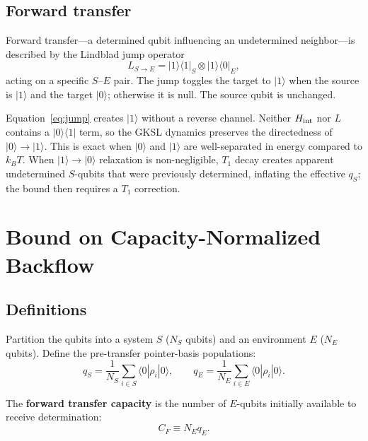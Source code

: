 \documentclass[aps,prl,twocolumn,superscriptaddress,hyperref]{revtex4-2}
\begin{document}
\subsection{Forward transfer}

Forward transfer---a determined qubit influencing an undetermined neighbor---is described by the Lindblad jump operator~\cite{Lindblad:1976,GKS:1976}
\begin{equation}
L_{S\to E} = |1\rangle\langle 1|_S \otimes |1\rangle\langle 0|_E,
\label{eq:jump}
\end{equation}
acting on a specific $S$--$E$ pair. The jump toggles the target to $|1\rangle$ when the source is $|1\rangle$ and the target $|0\rangle$; otherwise it is null. The source qubit is unchanged.

Equation~\eqref{eq:jump} creates $|1\rangle$ without a reverse channel. Neither $H_{\rm int}$ nor $L$ contains a $|0\rangle\langle 1|$ term, so the GKSL dynamics preserves the directedness of $|0\rangle \to |1\rangle$. This is exact when $|0\rangle$ and $|1\rangle$ are well-separated in energy compared to $k_B T$. When $|1\rangle \to |0\rangle$ relaxation is non-negligible, $T_1$ decay creates apparent undetermined $S$-qubits that were previously determined, inflating the effective $q_S$; the bound then requires a $T_1$ correction.

\section{Bound on Capacity-Normalized Backflow}
\label{sec:theorem}

\subsection{Definitions}

Partition the qubits into a system $S$ ($N_S$ qubits) and an environment $E$ ($N_E$ qubits). Define the pre-transfer pointer-basis populations:
\begin{equation}
q_S = \frac{1}{N_S}\sum_{i\in S} \langle 0|\rho_i|0\rangle, \qquad
q_E = \frac{1}{N_E}\sum_{i\in E} \langle 0|\rho_i|0\rangle.
\end{equation}

The \textbf{forward transfer capacity} is the number of $E$-qubits initially available to receive determination:
\begin{equation}
C_F \equiv N_E q_E.
\end{equation}
\end{document}
